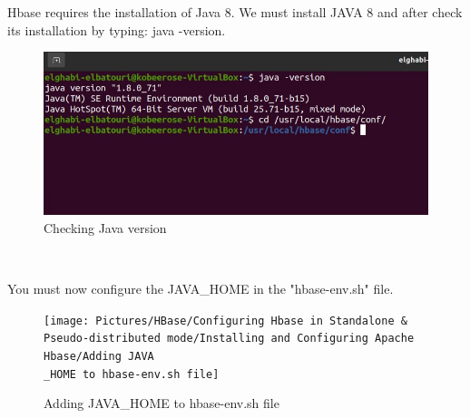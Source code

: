 \begin{spacing}{1.2}
\par Hbase requires the installation of Java 8. We must install JAVA 8 and after check its installation by typing: java -version.
\\
\begin{figure}[!htb] 
\begin{center} 
\includegraphics[width=1\linewidth]{Pictures/HBase/Configuring Hbase in Standalone & Pseudo-distributed mode/Installing and Configuring Apache Hbase/Checking Java version} 
\end{center} 
\caption{Checking Java version} 
\end{figure}  \FloatBarrier
\\

\par You must now configure the JAVA\_HOME in the "hbase-env.sh" file.
\\
\begin{figure}[!htb] 
\begin{center} 
\texttt{[image: Pictures/HBase/Configuring Hbase in Standalone \& Pseudo-distributed mode/Installing and Configuring Apache Hbase/Adding JAVA\\\_HOME to hbase-env.sh file]} 
\end{center} 
\caption{Adding JAVA\_HOME to hbase-env.sh file} 
\end{figure}  \FloatBarrier
\\


\end{spacing}
